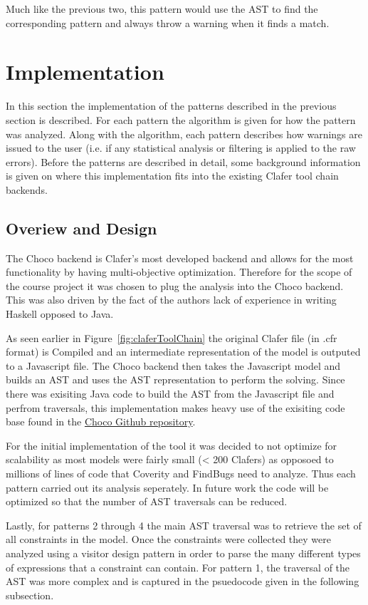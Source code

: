 \documentclass[10pt,oneside]{IEEEtran}
\begin{document}
Much like the previous two, this pattern would use the AST to find the corresponding pattern and always throw a warning when it finds a match.

\section{Implementation}
\label{sec:implementation}
In this section the implementation of the patterns described in the previous section is described. For each pattern the algorithm is given for how the pattern was analyzed. Along with the algorithm, each pattern describes how warnings are issued to the user (i.e. if any statistical analysis or filtering is applied to the raw errors). Before the patterns are described in detail, some background information is given on where this implementation fits into the existing Clafer tool chain backends.

\subsection{Overiew and Design}
The Choco backend is Clafer's most developed backend and allows for the most functionality by having multi-objective optimization. Therefore for the scope of the course project it was chosen to plug the analysis into the Choco backend. This was also driven by the fact of the authors lack of experience in writing Haskell opposed to Java.

As seen earlier in Figure~\ref{fig:claferToolChain} the original Clafer file (in .cfr format) is Compiled and an intermediate representation of the model is outputed to a Javascript file. The Choco backend then takes the Javascript model and builds an AST and uses the AST representation to perform the solving. Since there was exisiting Java code to build the AST from the Javascript file and perfrom traversals, this implementation makes heavy use of the exisiting code base found in the \href{https://github.com/gsdlab/chocosolver/}{Choco Github repository}.

For the initial implementation of the tool it was decided to not optimize for scalability as most models were fairly small (< 200 Clafers) as opposoed to millions of lines of code that Coverity and FindBugs need to analyze. Thus each pattern carried out its analysis seperately. In future work the code will be optimized so that the number of AST traversals can be reduced.

Lastly, for patterns 2 through 4 the main AST traversal was to retrieve the set of all constraints in the model. Once the constraints were collected they were analyzed using a visitor design pattern in order to parse the many different types of expressions that a constraint can contain. For pattern 1, the traversal of the AST was more complex and is captured in the psuedocode given in the following subsection.
\end{document}
